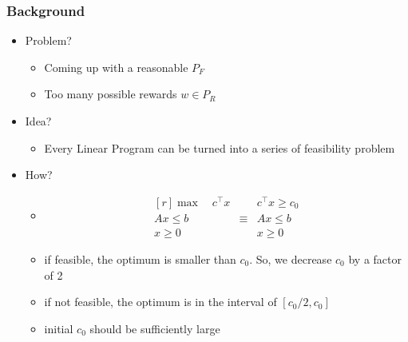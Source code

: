 \documentclass[aspectratio=169]{beamer}
\begin{document}
\begin{frame}
	\frametitle{Background}
	\begin{itemize}
		\item Problem?
			\begin{itemize}
				\item Coming up with a reasonable $P_F$
				\item Too many possible rewards $w \in P_R$
			\end{itemize}
		\item Idea?
			\begin{itemize}
				\item Every Linear Program can be turned into a series of feasibility problem
			\end{itemize}
		\item How?
			\begin{itemize}
				\item
				\[
					\begin{matrix*}[r]
						\max \quad c^\top x & & c^\top x \geq c_0\\
						Ax \leq b & \equiv & Ax \leq b\\
						x \geq 0 & &x \geq 0 
					\end{matrix*}
				\]


				\item if feasible, the optimum is smaller than $c_0$. So, we decrease $c_0$ by a factor of 2
				\item if not feasible, the optimum is in the interval of $[c_0/2, c_0]$
				\item initial $c_0$ should be sufficiently large 
			\end{itemize}
	\end{itemize}
\end{frame}
\end{document}
